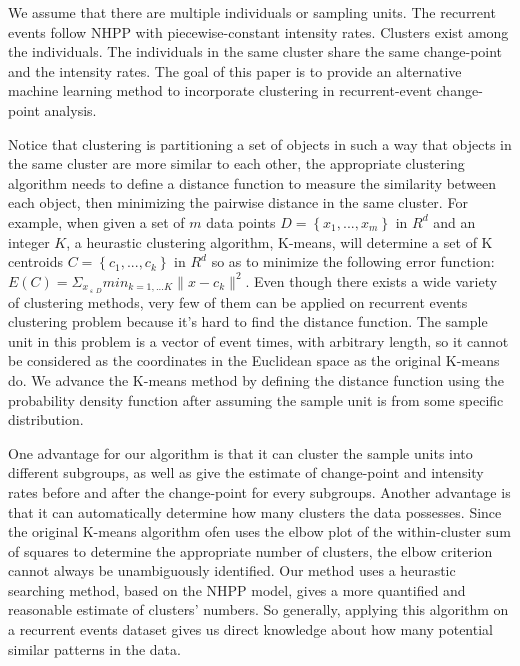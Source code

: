 \documentclass[12pt]{article}
\begin{document}
We assume that there are multiple individuals or sampling units. The recurrent events follow NHPP with piecewise-constant intensity rates. Clusters exist among the individuals. The individuals in the same cluster share the same change-point and the intensity rates. The goal of this paper is to provide an alternative machine learning method to incorporate clustering in recurrent-event change-point analysis.

Notice that clustering is partitioning a set of objects in such a way that objects in the same cluster are more similar to each other, the appropriate clustering algorithm needs to define a distance function to measure the similarity between each object, then minimizing the pairwise distance in the same cluster. For example, when given a set of $m$ data points $D=\left\lbrace x_1,...,x_m\right\rbrace $ in $R^{d}$ and an integer $K$, a heurastic clustering algorithm, K-means, will determine a set of K centroids $C=\left\lbrace c_1,...,c_k\right\rbrace $ in $R^{d}$ so as to minimize the following error function: $E(C)=\Sigma_{x_{\upepsilon D}}min_{k=1,...K}\parallel x-c_k \parallel^{2}$. Even though there exists a wide variety of clustering methods, very few of them can be applied on recurrent events clustering problem because it's hard to find the distance function. The sample unit in this problem is a vector of event times, with arbitrary length, so it cannot be considered as the coordinates in the Euclidean space as the original K-means do. We advance the K-means method by defining the distance function using the probability density function after assuming the sample unit is from some specific distribution.

One advantage for our algorithm is that it can cluster the sample units into different subgroups, as well as give the estimate of change-point and intensity rates before and after the change-point for every subgroups. Another advantage is that it can automatically determine how many clusters the data possesses. Since the original K-means algorithm ofen uses the elbow plot \cite{ketchen1996application} of the within-cluster sum of squares to determine the appropriate number of clusters, the elbow criterion cannot always be unambiguously identified. Our method uses a heurastic searching method, based on the NHPP model, gives a more quantified and reasonable estimate of clusters' numbers. So generally, applying this algorithm on a recurrent events dataset gives us direct knowledge about how many potential similar patterns in the data.
\end{document}

